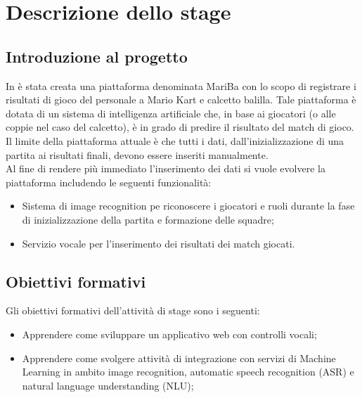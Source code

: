 
\chapter{Descrizione dello stage}
\label{cap:descrizione-stage}

\section{Introduzione al progetto}
In \azienda è stata creata una piattaforma denominata MariBa con lo scopo di registrare i risultati di gioco del personale a Mario Kart e calcetto balilla. Tale piattaforma è dotata di un sistema di intelligenza artificiale che, in base ai giocatori (o alle coppie nel caso del calcetto), è in grado di predire il risultato del match di gioco. Il limite della
piattaforma attuale è che tutti i dati, dall'inizializzazione di una partita ai risultati finali, devono essere inseriti
manualmente. \\

Al fine di rendere più immediato l'inserimento dei dati si vuole evolvere la piattaforma includendo le seguenti funzionalità:
\begin{itemize}
	\item Sistema di \gls{image recognition} pe riconoscere i giocatori e ruoli durante la fase di inizializzazione della partita
	e formazione delle squadre;
	\item Servizio vocale per l'inserimento dei risultati dei match giocati.
\end{itemize}


\section{Obiettivi formativi}
	Gli obiettivi formativi dell'attività di stage sono i seguenti:
	\begin{itemize}
		\item Apprendere come sviluppare un applicativo web con controlli vocali;
		\item Apprendere come svolgere attività di integrazione con servizi di Machine Learning in ambito \gls{image recognition}, \gls{automatic speech recognition} (ASR) e \gls{natural language understanding} (NLU);
	\end{itemize}

